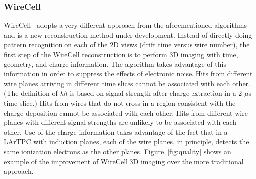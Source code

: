 \subsubsection{WireCell}

WireCell~\cite{wire-cell} adopts a very different approach from the 
aforementioned algorithms and is a new reconstruction method under development.
Instead of directly doing pattern recognition on each of the 2D views (drift 
time versus wire number), the first step of the WireCell reconstruction is to 
perform 3D imaging with time, geometry, and charge information. 
The algorithm takes advantage of this %
information in order to suppress the effects of electronic noise.
Hits from  different wire planes arriving in different time 
slices cannot be associated with each other. (The definition
of \textit{hit} is based on signal strength after charge extraction %
in a 2-$\mu$s time slice.) Hits
from wires that do not cross in a region consistent with the charge deposition cannot be associated with each other. 
Hits from different wire planes
with different signal strengths are unlikely to be associated with each other. 
Use of the charge information takes advantage of the fact that in a LArTPC with induction planes,
each of the wire planes, in principle, detects the same ionization electrons as the other planes. 
Figure~\ref{fig:quality} shows an example of the improvement of WireCell 3D imaging
over the more traditional approach. 

